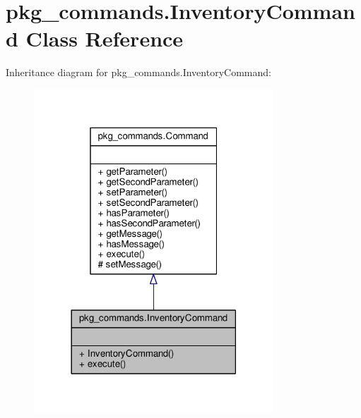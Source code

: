 \hypertarget{classpkg__commands_1_1InventoryCommand}{\section{pkg\-\_\-commands.\-Inventory\-Command Class Reference}
\label{classpkg__commands_1_1InventoryCommand}
}


Inheritance diagram for pkg\-\_\-commands.\-Inventory\-Command\-:
\nopagebreak
\begin{figure}[H]
\begin{center}
\leavevmode
\includegraphics[width=254pt]{classpkg__commands_1_1InventoryCommand__inherit__graph}
\end{center}
\end{figure}


